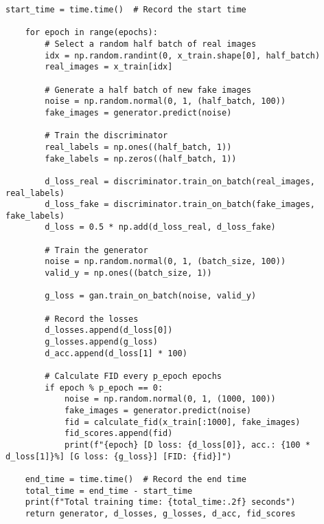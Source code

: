 \begin{lstlisting}[style=mypython, caption=Explore GAN with more convolutional layers 6]
    start_time = time.time()  # Record the start time

    for epoch in range(epochs):
        # Select a random half batch of real images
        idx = np.random.randint(0, x_train.shape[0], half_batch)
        real_images = x_train[idx]

        # Generate a half batch of new fake images
        noise = np.random.normal(0, 1, (half_batch, 100))
        fake_images = generator.predict(noise)

        # Train the discriminator
        real_labels = np.ones((half_batch, 1))
        fake_labels = np.zeros((half_batch, 1))

        d_loss_real = discriminator.train_on_batch(real_images, real_labels)
        d_loss_fake = discriminator.train_on_batch(fake_images, fake_labels)
        d_loss = 0.5 * np.add(d_loss_real, d_loss_fake)

        # Train the generator
        noise = np.random.normal(0, 1, (batch_size, 100))
        valid_y = np.ones((batch_size, 1))

        g_loss = gan.train_on_batch(noise, valid_y)

        # Record the losses
        d_losses.append(d_loss[0])
        g_losses.append(g_loss)
        d_acc.append(d_loss[1] * 100)
        
        # Calculate FID every p_epoch epochs
        if epoch % p_epoch == 0:
            noise = np.random.normal(0, 1, (1000, 100))
            fake_images = generator.predict(noise)
            fid = calculate_fid(x_train[:1000], fake_images)
            fid_scores.append(fid)
            print(f"{epoch} [D loss: {d_loss[0]}, acc.: {100 * d_loss[1]}%] [G loss: {g_loss}] [FID: {fid}]")

    end_time = time.time()  # Record the end time
    total_time = end_time - start_time
    print(f"Total training time: {total_time:.2f} seconds")
    return generator, d_losses, g_losses, d_acc, fid_scores
\end{lstlisting}

